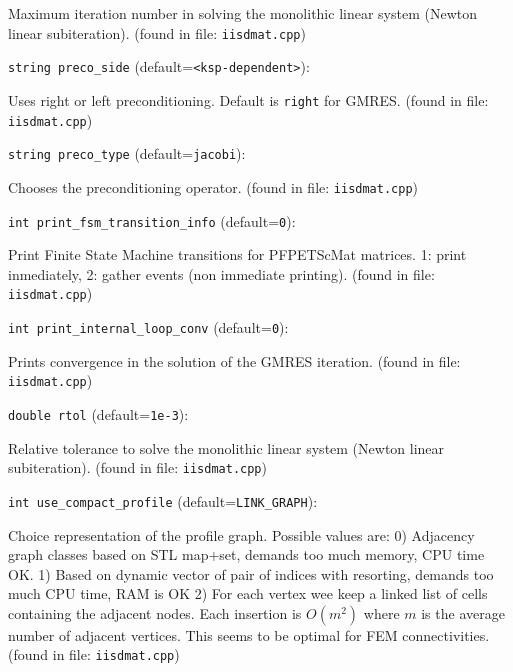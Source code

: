 Maximum iteration number in solving the monolithic linear
system (Newton linear subiteration).
 (found in file: \verb+iisdmat.cpp+)
\item\verb+string preco_side+ {\rm(default=\verb|<ksp-dependent>|)}:

Uses right or left preconditioning. Default is \verb+right+ for
GMRES. 
 (found in file: \verb+iisdmat.cpp+)
\item\verb+string preco_type+ {\rm(default=\verb|jacobi|)}:

Chooses the preconditioning operator. 
 (found in file: \verb+iisdmat.cpp+)
\item\verb+int print_fsm_transition_info+ {\rm(default=\verb|0|)}:

Print Finite State Machine transitions for PFPETScMat matrices.
1: print inmediately, 2: gather events (non immediate printing). 
 (found in file: \verb+iisdmat.cpp+)
\item\verb+int print_internal_loop_conv+ {\rm(default=\verb|0|)}:

Prints convergence in the solution of the GMRES iteration. 
 (found in file: \verb+iisdmat.cpp+)
\item\verb+double rtol+ {\rm(default=\verb|1e-3|)}:

Relative tolerance to solve the monolithic linear
system (Newton linear subiteration).
 (found in file: \verb+iisdmat.cpp+)
\item\verb+int use_compact_profile+ {\rm(default=\verb|LINK_GRAPH|)}:

Choice representation of the profile graph. Possible values are:
0) Adjacency graph classes
based on STL map+set, demands too much memory, CPU time OK.
1) Based on dynamic vector of pair of indices with resorting,
demands too much CPU time, RAM is OK
2) For each vertex wee keep a linked list of cells containing the
adjacent nodes. Each insertion is $O(m^2)$ where $m$ is the average
number of adjacent vertices. This seems to be optimal for
FEM connectivities.
 (found in file: \verb+iisdmat.cpp+)
